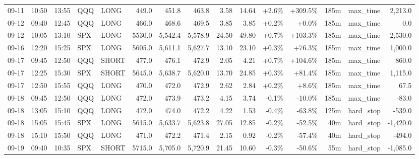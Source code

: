 \documentclass[11pt,a4paper,twoside]{article}
\begin{document}
\begin{landscape}
\begin{center}
\begin{longtable}{>{\color{txtmain}}l l l l l r r r r r r r r >{\color{txtmain}}l r}
09-11 & 10:50 & 13:55 & QQQ & LONG & 449.0 & 451.8 & 463.8 & 3.58 & 14.64 & \textcolor{wingreen}{+2.6\%} & \textcolor{wingreen}{+309.5\%} & 185m & max\_time & \textcolor{wingreen}{2,213.0} \\
09-12 & 09:40 & 12:45 & QQQ & LONG & 466.0 & 468.6 & 469.5 & 3.85 & 3.85 & \textcolor{wingreen}{+0.2\%} & \textcolor{wingreen}{+0.0\%} & 185m & max\_time & \textcolor{wingreen}{0.0} \\
09-12 & 10:05 & 13:10 & SPX & LONG & 5530.0 & 5,542.4 & 5,578.9 & 24.50 & 49.80 & \textcolor{wingreen}{+0.7\%} & \textcolor{wingreen}{+103.3\%} & 185m & max\_time & \textcolor{wingreen}{2,530.0} \\
09-16 & 12:20 & 15:25 & SPX & LONG & 5605.0 & 5,611.1 & 5,627.7 & 13.10 & 23.10 & \textcolor{wingreen}{+0.3\%} & \textcolor{wingreen}{+76.3\%} & 185m & max\_time & \textcolor{wingreen}{1,000.0} \\
09-17 & 09:45 & 12:50 & QQQ & SHORT & 477.0 & 476.1 & 472.9 & 2.05 & 4.21 & \textcolor{wingreen}{+0.7\%} & \textcolor{wingreen}{+104.6\%} & 185m & max\_time & \textcolor{wingreen}{860.0} \\
09-17 & 12:25 & 15:30 & SPX & SHORT & 5645.0 & 5,638.7 & 5,620.0 & 13.70 & 24.85 & \textcolor{wingreen}{+0.3\%} & \textcolor{wingreen}{+81.4\%} & 185m & max\_time & \textcolor{wingreen}{1,115.0} \\
09-17 & 12:50 & 15:55 & QQQ & LONG & 470.0 & 472.0 & 472.9 & 2.62 & 2.84 & \textcolor{wingreen}{+0.2\%} & \textcolor{wingreen}{+8.6\%} & 185m & max\_time & \textcolor{wingreen}{67.5} \\
09-18 & 09:45 & 12:50 & QQQ & LONG & 472.0 & 473.9 & 473.2 & 4.15 & 3.74 & \textcolor{lossred}{-0.1\%} & \textcolor{lossred}{-10.0\%} & 185m & max\_time & \textcolor{lossred}{-83.0} \\
09-18 & 13:05 & 15:10 & QQQ & LONG & 472.0 & 474.0 & 472.2 & 4.22 & 1.53 & \textcolor{lossred}{-0.4\%} & \textcolor{lossred}{-63.8\%} & 125m & hard\_stop & \textcolor{lossred}{-539.0} \\
09-18 & 15:05 & 15:45 & SPX & LONG & 5615.0 & 5,633.7 & 5,623.8 & 27.05 & 12.85 & \textcolor{lossred}{-0.2\%} & \textcolor{lossred}{-52.5\%} & 40m & hard\_stop & \textcolor{lossred}{-1,420.0} \\
09-18 & 15:10 & 15:50 & QQQ & LONG & 471.0 & 472.2 & 471.4 & 2.15 & 0.92 & \textcolor{lossred}{-0.2\%} & \textcolor{lossred}{-57.4\%} & 40m & hard\_stop & \textcolor{lossred}{-494.0} \\
09-19 & 09:40 & 10:35 & SPX & SHORT & 5715.0 & 5,705.0 & 5,720.9 & 21.45 & 10.60 & \textcolor{lossred}{-0.3\%} & \textcolor{lossred}{-50.6\%} & 55m & hard\_stop & \textcolor{lossred}{-1,085.0} \\

\end{longtable}
\end{center}
\end{landscape}
\end{document}
